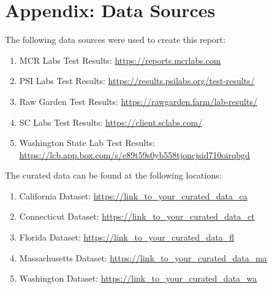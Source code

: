 \documentclass[../article.tex, 12pt]{subfiles}
\begin{document}
\pagestyle{regular}
\section{Appendix: Data Sources}

The following data sources were used to create this report:

\begin{enumerate}
    \item MCR Labs Test Results: \url{https://reports.mcrlabs.com}
    \item PSI Labs Test Results: \url{https://results.psilabs.org/test-results/}
    \item Raw Garden Test Results: \url{https://rawgarden.farm/lab-results/}
    \item SC Labs Test Results: \url{https://client.sclabs.com/}
    \item Washington State Lab Test Results: \url{https://lcb.app.box.com/s/e89t59s0yb558tjoncjsid710oirqbgd}
\end{enumerate}

The curated data can be found at the following locations:

\begin{enumerate}
    \item California Dataset: \url{https://link_to_your_curated_data_ca}
    \item Connecticut Dataset: \url{https://link_to_your_curated_data_ct}
    \item Florida Dataset: \url{https://link_to_your_curated_data_fl}
    \item Massachusetts Dataset: \url{https://link_to_your_curated_data_ma}
    \item Washington Dataset: \url{https://link_to_your_curated_data_wa}
\end{enumerate}

\thispagestyle{regular}
\end{document}
